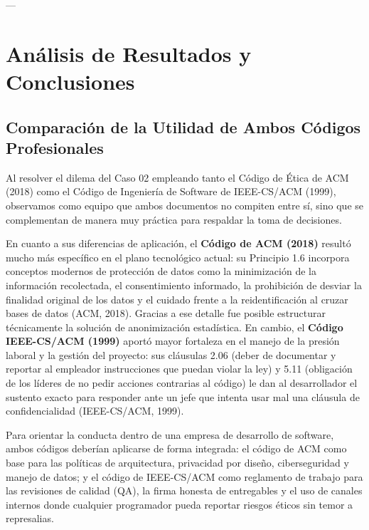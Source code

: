 \documentclass[12pt,a4paper,oneside]{article}
\begin{document}
---

\section{Análisis de Resultados y Conclusiones}

\subsection{Comparación de la Utilidad de Ambos Códigos Profesionales}
Al resolver el dilema del Caso 02 empleando tanto el Código de Ética de ACM (2018) como el Código de Ingeniería de Software de IEEE-CS/ACM (1999), observamos como equipo que ambos documentos no compiten entre sí, sino que se complementan de manera muy práctica para respaldar la toma de decisiones.

En cuanto a sus diferencias de aplicación, el \textbf{Código de ACM (2018)} resultó mucho más específico en el plano tecnológico actual: su Principio 1.6 incorpora conceptos modernos de protección de datos como la minimización de la información recolectada, el consentimiento informado, la prohibición de desviar la finalidad original de los datos y el cuidado frente a la reidentificación al cruzar bases de datos (ACM, 2018). Gracias a ese detalle fue posible estructurar técnicamente la solución de anonimización estadística. En cambio, el \textbf{Código IEEE-CS/ACM (1999)} aportó mayor fortaleza en el manejo de la presión laboral y la gestión del proyecto: sus cláusulas 2.06 (deber de documentar y reportar al empleador instrucciones que puedan violar la ley) y 5.11 (obligación de los líderes de no pedir acciones contrarias al código) le dan al desarrollador el sustento exacto para responder ante un jefe que intenta usar mal una cláusula de confidencialidad (IEEE-CS/ACM, 1999).

Para orientar la conducta dentro de una empresa de desarrollo de software, ambos códigos deberían aplicarse de forma integrada: el código de ACM como base para las políticas de arquitectura, privacidad por diseño, ciberseguridad y manejo de datos; y el código de IEEE-CS/ACM como reglamento de trabajo para las revisiones de calidad (QA), la firma honesta de entregables y el uso de canales internos donde cualquier programador pueda reportar riesgos éticos sin temor a represalias.
\end{document}
